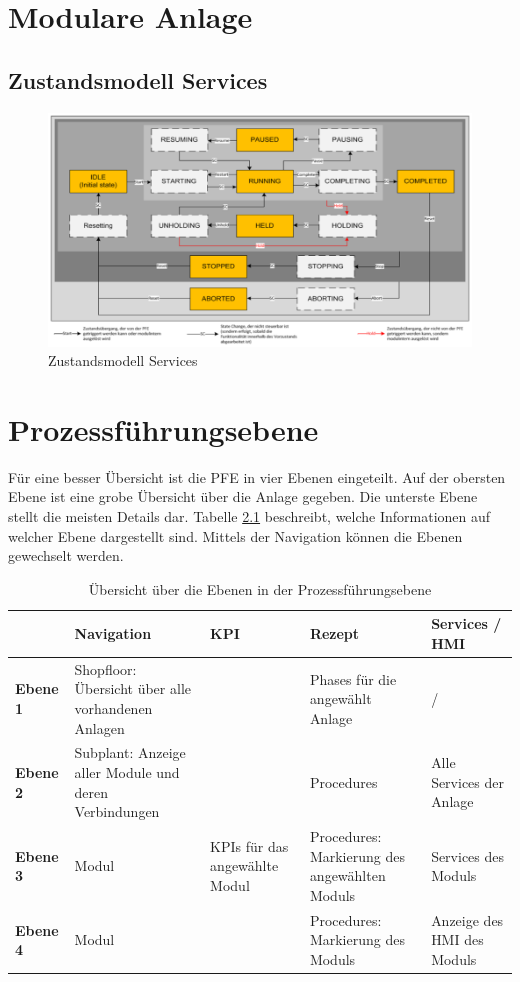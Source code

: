\chapter{Modulare Anlage}
\section{Zustandsmodell Services}
\label{A:Zustandsmodell-Services}

 \begin{figure}[htbp]
 \centering
 \includegraphics[scale=0.55]{DA_files/Bilder/Anhang/Zustandsdiagramm-Services.png}
 \caption{Zustandsmodell Services}
 \label{pic:Zustandsmodell-Service}
 \end{figure}

\chapter{Prozessführungsebene}
\label{A:PFE}

Für eine besser Übersicht ist die PFE in vier Ebenen eingeteilt. Auf der obersten Ebene ist eine grobe Übersicht über die Anlage gegeben. Die unterste Ebene stellt die meisten Details dar. Tabelle \ref{tab:Ebenen-PFE} beschreibt, welche Informationen auf welcher Ebene dargestellt sind. Mittels der Navigation können die Ebenen gewechselt werden.

\begin{table}[htbp]
\caption{Übersicht über die Ebenen in der Prozessführungsebene}
\centering
\begin{tabular}{p{}|p{}|p{}|p{}|p{}|}
 & \textbf{Navigation} & \textbf{KPI} & \textbf{Rezept} & \textbf{Services / HMI} \\
\hline
\textbf{Ebene 1} & Shopfloor: Übersicht über alle vorhandenen Anlagen & & Phases für die angewählt Anlage & / \\
\hline
\textbf{Ebene 2} & Subplant: Anzeige aller Module und deren Verbindungen &  & Procedures & Alle Services der Anlage \\
\hline
\textbf{Ebene 3} & Modul & KPIs für das angewählte Modul & Procedures: Markierung des angewählten Moduls & Services des Moduls \\
\hline \textbf{Ebene 4} & Modul & & Procedures: Markierung des Moduls & Anzeige des HMI des Moduls \\
\hline
\end{tabular}
\label{tab:Ebenen-PFE}
\end{table}

